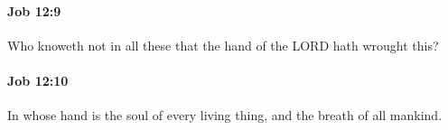 		\paragraph{Job 12:9} %
			\label{JOB-12-9}

			Who knoweth not in all these that the hand of the LORD hath wrought this?


		\paragraph{Job 12:10} %
			\label{JOB-12-10}

			In whose hand is the soul of every living thing, and the breath of all mankind.


